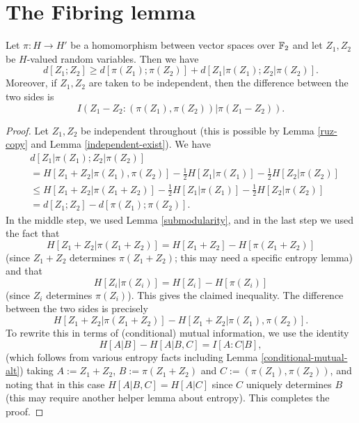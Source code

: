 \chapter{The Fibring lemma}

\begin{proposition}\label{projections-1}
  Let $\pi : H \to H'$ be a homomorphism between vector spaces over $\mathbb{F}_2$ and let $Z_1,Z_2$ be $H$-valued random variables. Then we have
  \[
    d[Z_1; Z_2] \geq d[\pi(Z_1);\pi(Z_2)] + d[Z_1|\pi(Z_1); Z_2 |\pi(Z_2)].
  \]
  Moreover, if $Z_1,Z_2$ are taken to be independent, then the difference between the two sides is
$$I( Z_1 - Z_2 : (\pi(Z_1), \pi(Z_2))  |  \pi(Z_1 - Z_2) ).$$
\end{proposition}


\begin{proof}
  Let $Z_1,Z_2$ be independent throughout (this is possible by Lemma \ref{ruz-copy} and Lemma \ref{independent-exist}).  We have
  \begin{align*}
    & d[Z_1  |\pi(Z_1); Z_2 |\pi(Z_2)] \\
    & = H[ Z_1 + Z_2 | \pi(Z_1),\pi(Z_2)] - \tfrac{1}{2} H[Z_1 | \pi(Z_1)] - \tfrac{1}{2} H[Z_2 | \pi(Z_2)] \\
    & \leq  H[ Z_1 + Z_2 | \pi(Z_1+Z_2)]  - \tfrac{1}{2} H[Z_1 | \pi(Z_1)] - \tfrac{1}{2}H[Z_2 | \pi(Z_2)] \\
    & = d[Z_1;Z_2] - d[\pi(Z_1);\pi(Z_2)].
  \end{align*}
  In the middle step, we used Lemma \ref{submodularity}, and in the last step we used the fact that
  \[ H[Z_1 + Z_2 |  \pi(Z_1+Z_2)] = H[Z_1 + Z_2] - H[\pi(Z_1+Z_2)]\]
  (since $Z_1 + Z_2$ determines $\pi(Z_1 + Z_2)$; this may need a specific entropy lemma) and that
  \[ H[Z_i| \pi(Z_i)] = H[Z_i] - H[\pi(Z_i)]\] (since $Z_i$ determines $\pi(Z_i)$).
  This gives the claimed inequality. The difference between the two sides is precisely
  \[ H[Z_1 + Z_2  | \pi(Z_1 + Z_2)] - H[Z_1 + Z_2  | \pi(Z_1),\pi(Z_2)].\]
  To rewrite this in terms of (conditional) mutual information, we use the identity
  \[ H[A|B] - H[A | B,C] = I[A : C | B],\]
  (which follows from various entropy facts including Lemma \ref{conditional-mutual-alt})
  taking
  $A := Z_1 + Z_2$, $B := \pi(Z_1 + Z_2)$ and $C := (\pi(Z_1),\pi(Z_{2}))$, and noting that in this case $H[A | B,C] = H[A | C]$ since $C$ uniquely determines $B$ (this may require another helper lemma about entropy).
  This completes the proof.
\end{proof}

